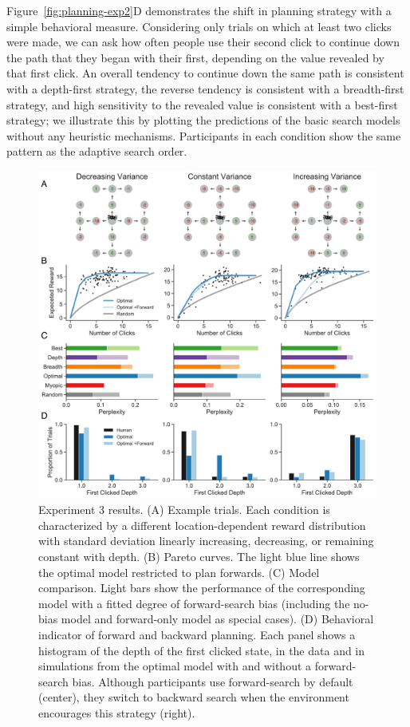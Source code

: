 Figure~\ref{fig:planning-exp2}D demonstrates the shift in planning strategy with a simple behavioral measure. Considering only trials on which at least two clicks were made, we can ask how often people use their second click to continue down the path that they began with their first, depending on the value revealed by that first click. An overall tendency to continue down the same path is consistent with a depth-first strategy, the reverse tendency is consistent with a breadth-first strategy, and high sensitivity to the revealed value is consistent with a best-first strategy; we illustrate this by plotting the predictions of the basic search models without any heuristic mechanisms. Participants in each condition show the same pattern as the adaptive search order.

\begin{figure}[p]
  \centering
  \includegraphics[width=\textwidth]{figs/planning/fig5.pdf}
  \caption{Experiment 3 results.
  (A) Example trials. Each condition is characterized by a different location-dependent reward distribution with standard deviation linearly increasing, decreasing, or remaining constant with depth.
  (B) Pareto curves. 
  The light blue line shows the optimal model restricted to plan forwards.
  (C) Model comparison. Light bars show the performance of the corresponding model with a fitted degree of forward-search bias (including the no-bias model and forward-only model as special cases).
  (D) Behavioral indicator of forward and backward planning. Each panel shows a histogram of the depth of the first clicked state, in the data and in simulations from the optimal model with and without a forward-search bias. Although participants use forward-search by default (center), they switch to backward search when the environment encourages this strategy (right).
  \vspace{1cm}
  }
  \label{fig:planning-exp3}
\end{figure}


